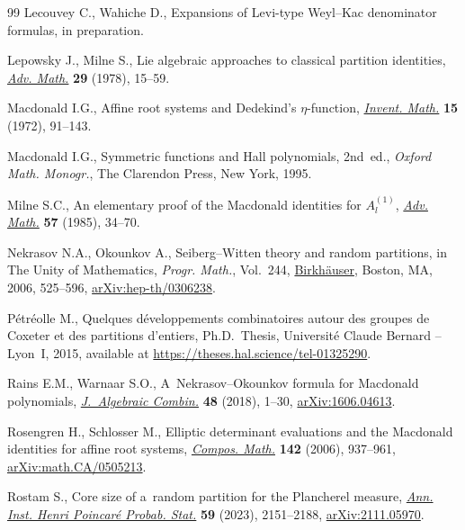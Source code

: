 \begin{thebibliography}{99}
Lecouvey C., Wahiche D., Expansions of {L}evi-type {W}eyl--{K}ac denominator
 formulas, {i}n preparation.

Lepowsky J., Milne S., Lie algebraic approaches to classical partition
 identities, \href{https://doi.org/10.1016/0001-8708(78)90004-X}{\textit{Adv. Math.}} \textbf{29} (1978), 15--59.

Macdonald I.G., Affine root systems and {D}edekind's {$\eta $}-function,
 \href{https://doi.org/10.1007/BF01418931}{\textit{Invent. Math.}} \textbf{15} (1972), 91--143.

Macdonald I.G., Symmetric functions and {H}all polynomials, 2nd~ed., \textit{Oxford
 Math. Monogr.}, The Clarendon Press, New York, 1995.

Milne S.C., An elementary proof of the {M}acdonald identities for
 {$A^{(1)}_l$}, \href{https://doi.org/10.1016/0001-8708(85)90105-7}{\textit{Adv. Math.}} \textbf{57} (1985), 34--70.

Nekrasov N.A., Okounkov A., {S}eiberg--{W}itten theory and random partitions,
 in The Unity of Mathematics, \textit{Progr. Math.}, Vol.~244, \href{https://doi.org/10.1007/0-8176-4467-9_15}{Birkh\"auser},
 Boston, MA, 2006, 525--596, \href{https://arxiv.org/abs/hep-th/0306238}{arXiv:hep-th/0306238}.

P\'etr\'eolle M., Quelques d\'eveloppements combinatoires autour des groupes de
 Coxeter et des partitions d'entiers, Ph.D.~Thesis, {U}niversit\'e Claude
 Bernard -- Lyon~I, 2015, available at
 \url{https://theses.hal.science/tel-01325290}.

Rains E.M., Warnaar S.O., A~{N}ekrasov--{O}kounkov formula for {M}acdonald
 polynomials, \href{https://doi.org/10.1007/s10801-017-0790-2}{\textit{J.~Algebraic Combin.}} \textbf{48} (2018), 1--30,
 \href{https://arxiv.org/abs/1606.04613}{arXiv:1606.04613}.

Rosengren H., Schlosser M., Elliptic determinant evaluations and the
 {M}acdonald identities for affine root systems, \href{https://doi.org/10.1112/S0010437X0600203X}{\textit{Compos. Math.}}
 \textbf{142} (2006), 937--961, \href{https://arxiv.org/abs/math.CA/0505213}{arXiv:math.CA/0505213}.

Rostam S., Core size of a~random partition for the {P}lancherel measure,
 \href{https://doi.org/10.1214/22-aihp1310}{\textit{Ann. Inst. Henri Poincar\'e Probab. Stat.}} \textbf{59} (2023),
 2151--2188, \href{https://arxiv.org/abs/2111.05970}{arXiv:2111.05970}.


\end{thebibliography}
